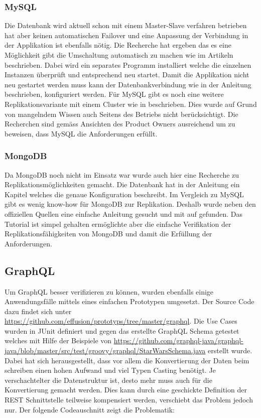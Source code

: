 \subsubsection{MySQL}

Die Datenbank wird aktuell schon mit einem Master-Slave verfahren betrieben hat aber keinen automatischen Failover und eine Anpassung der Verbindung in der Applikation ist ebenfalls nötig. Die Recherche hat ergeben das es eine Möglichkeit gibt die Umschaltung automatisch zu machen wie im Artikeln \cite{mysqlrep} beschrieben. Dabei wird ein separates Programm installiert welche die einzelnen Instanzen überprüft und entsprechend neu startet. Damit die Applikation nicht neu gestartet werden muss kann der Datenbankverbindung wie in der Anleitung \cite{mysqljdbc} beschrieben, konfiguriert werden. Für MySQL gibt es noch eine weitere Replikationsvariante mit einem Cluster wie in \cite{mysqlcluster} beschrieben. Dies wurde auf Grund von mangelndem Wissen auch Seitens des Betriebs nicht berücksichtigt. Die Recherchen sind gemäss Ansichten des Product Owners ausreichend um zu beweisen, dass MySQL die Anforderungen erfüllt.

\subsubsection{MongoDB}

Da MongoDB noch nicht im Einsatz war wurde auch hier eine Recherche zu Replikationsmöglichkeiten gemacht. Die Datenbank hat in der Anleitung ein Kapitel \cite{mongorep} welches die genaue Konfiguration beschreibt. Im Vergleich zu MySQL gibt es wenig know-how für MongoDB zur Replikation. Deshalb wurde neben den offiziellen Quellen eine einfache Anleitung gesucht und mit \cite{mongorep2} auf gefunden. Das Tutorial ist simpel gehalten ermöglichte aber die einfache Verifikation der Replikationsfähigkeiten von MongoDB und damit die Erfüllung der Anforderungen.
\newpage

\subsection{GraphQL}

Um GraphQL besser verifizieren zu können, wurden ebenfalls einige Anwendungsfälle mittels eines einfachen Prototypen umgesetzt. Der Source Code dazu findet sich unter \url{https://github.com/effusion/prototyps/tree/master/graphql}. Die Use Cases wurden in JUnit definiert und gegen das erstellte GraphQL Schema getestet welches mit Hilfe der Beispiele von \url{https://github.com/graphql-java/graphql-java/blob/master/src/test/groovy/graphql/StarWarsSchema.java} erstellt wurde. Dabei hat sich herausgestellt, dass vor allem die Konvertierung der Daten beim schreiben einen hohen Aufwand und viel Typen Casting benötigt. Je verschachtelter die Datenstruktur ist, desto mehr muss auch für die Konvertierung gemacht werden. Dies kann durch eine geschickte Definition der REST Schnittstelle teilweise kompensiert werden, verschiebt das Problem jedoch nur. Der folgende Codeauschnitt zeigt die Problematik:

